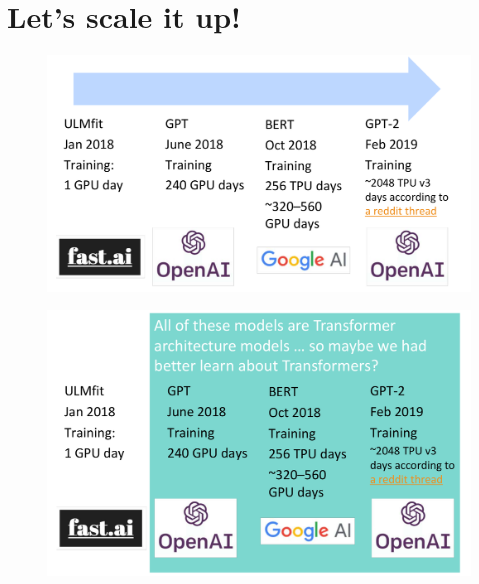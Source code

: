 \section{Let’s scale it up!}


     \begin{figure}[h]
        	\includegraphics[scale = 0.28]{pics/llmscale.png}
        \end{figure}  



     \begin{figure}[h]
        	\includegraphics[scale = 0.28]{pics/llmscale_trans.png}
        \end{figure}  


